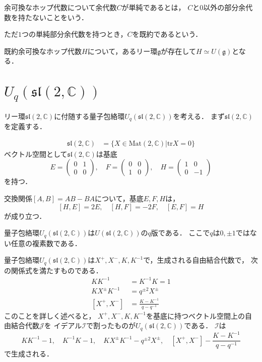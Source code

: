 \documentclass[10pt,dvipdfm]{beamer}
\newcommand{\CC}{\mathbb{C}}
\begin{document}
  \begin{frame}
    余可換なホップ代数について余代数$C$が単純であるとは，
    $C$と$0$以外の部分余代数を持たないことをいう．

    ただ$1$つの単純部分余代数を持つとき，$C$を既約であるという．
    \begin{theorem}
      既約余可換なホップ代数$H$について，あるリー環$\mathfrak{g}$が存在して$H\simeq U(\mathfrak{g})$となる．
    \end{theorem}
  \end{frame}
  \section{$U_q(\mathfrak{sl}(2,\CC))$}
  \begin{frame}
    リー環$\mathfrak{sl}(2,\CC)$に付随する量子包絡環$U_q(\mathfrak{sl}(2,\CC))$を考える．
    まず$\mathfrak{sl}(2,\CC)$を定義する．
    \begin{definition}
      \begin{align*}
        \mathfrak{sl}(2,\CC) &= \{X \in \text{Mat}(2,\CC) | \text{tr} X = 0\}
      \end{align*}
      ベクトル空間として$\mathfrak{sl}(2,\CC)$は基底
      \[
      E=\begin{pmatrix} 0 & 1 \\ 0 & 0 \end{pmatrix},\quad F=\begin{pmatrix} 0 & 0 \\ 1 & 0 \end{pmatrix},\quad H=\begin{pmatrix} 1 & 0 \\ 0 & -1 \end{pmatrix}
      \]
      を持つ．
    \end{definition}
    交換関係$[A,B]=AB-BA$について，基底$E,F,H$は，
    \[
    [H,E]=2E,\quad [H,F]=-2F,\quad [E,F]=H
    \]
    が成り立つ．
  \end{frame}
  \begin{frame}
    量子包絡環$U_q(\mathfrak{sl}(2,\CC))$は$U(\mathfrak{sl}(2,\CC))$の$q$版である．
    ここで$q$は$0,\pm1$ではない任意の複素数である．

    量子包絡環$U_q(\mathfrak{sl}(2,\CC))$は$X^+,X^-,K,K^{-1}$で，生成される自由結合代数で，
    次の関係式を満たすものである．
    \begin{align*}
      KK^{-1} &= K^{-1}K = 1\\
      KX^{\pm}K^{-1} &= q^{\pm2}X^{\pm}\\
      [X^+,X^-] &= \frac{K-K^{-1}}{q-q^{-1}}
    \end{align*}
    このことを詳しく述べると，
    $X^+,X^-,K,K^{-1}$を基底に持つベクトル空間上の自由結合代数$\mathscr{J}$を
    イデアル$\mathscr{I}$で割ったものが$U_q(\mathfrak{sl}(2,\CC))$である．
    $\mathscr{I}$は
    \[
    KK^{-1}-1,\quad K^{-1}K-1,\quad KX^{\pm}K^{-1}-q^{\pm2}X^{\pm},\quad [X^+,X^-]-\frac{K-K^{-1}}{q-q^{-1}}
    \]
    で生成される．
  \end{frame}
\end{document}
